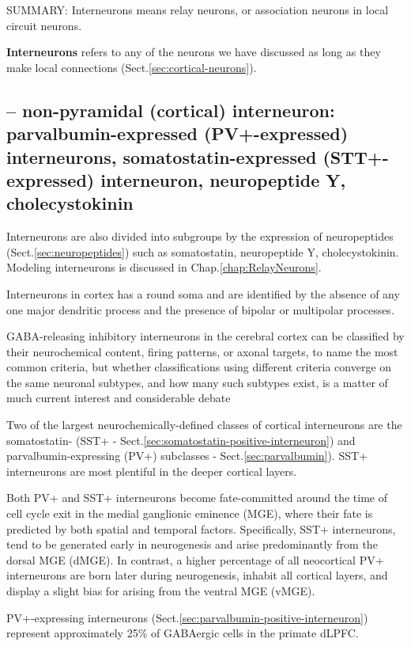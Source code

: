 SUMMARY: Interneurons means relay neurons, or association neurons in
local circuit neurons.

{\bf Interneurons} refers to any of the neurons we have discussed as long as
they make local connections (Sect.\ref{sec:cortical-neurons}). 


\subsection{-- non-pyramidal (cortical) interneuron:
parvalbumin-expressed (PV+-expressed) interneurons,  somatostatin-expressed
(STT+-expressed) interneuron, neuropeptide Y, cholecystokinin}
\label{sec:cortical-interneuron}  
\label{sec:interneurons-cortical}

Interneurons are also divided into subgroups by the expression of neuropeptides
(Sect.\ref{sec:neuropeptides}) such as somatostatin, neuropeptide Y, cholecystokinin.
Modeling interneurons is discussed in Chap.\ref{chap:RelayNeurons}.

Interneurons in cortex has a round soma and are identified by the absence of any
one major dendritic process and the presence of bipolar or multipolar processes.

GABA-releasing inhibitory interneurons in the cerebral cortex can be classified
by their neurochemical content, firing patterns, or axonal targets, to name the
most common criteria, but whether classifications using different criteria
converge on the same neuronal subtypes, and how many such subtypes exist, is a
matter of much current interest and considerable debate

Two of the largest neurochemically-defined classes of cortical interneurons are
the somatostatin- (SST+ - Sect.\ref{sec:somatostatin-positive-interneuron}) and
parvalbumin-expressing (PV+) subclasses - Sect.\ref{sec:parvalbumin}).
SST+ interneurons are most plentiful in the deeper cortical layers.

Both PV+ and SST+ interneurons become fate-committed around the time of cell
cycle exit in the medial ganglionic eminence (MGE), where their fate is
predicted by both spatial and temporal factors. Specifically, SST+ interneurons,
tend to be generated early in neurogenesis and arise predominantly from the
dorsal MGE (dMGE). In contrast, a higher percentage of all neocortical PV+
interneurons are born later during neurogenesis, inhabit all cortical layers,
and display a slight bias for arising from the ventral MGE (vMGE).

PV+-expressing interneurons
(Sect.\ref{sec:parvalbumin-positive-interneuron}) represent approximately 25\%
of GABAergic cells in the primate dLPFC. 


